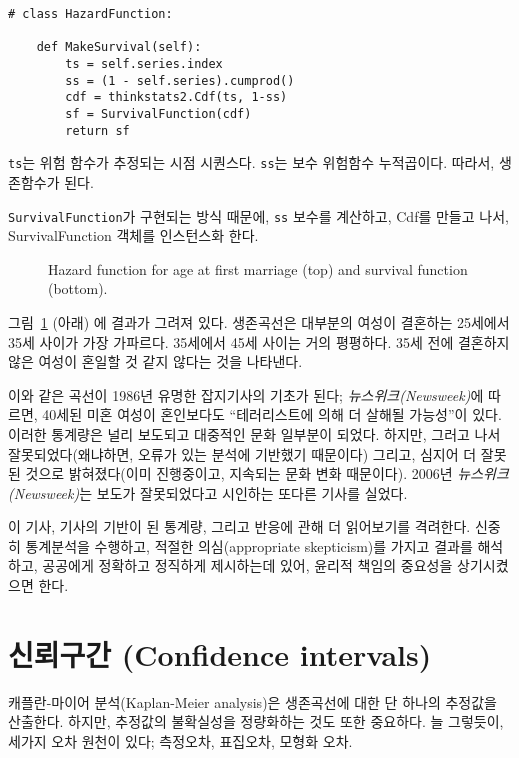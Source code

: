 \begin{verbatim}
# class HazardFunction:

    def MakeSurvival(self):
        ts = self.series.index
        ss = (1 - self.series).cumprod()
        cdf = thinkstats2.Cdf(ts, 1-ss)
        sf = SurvivalFunction(cdf)
        return sf
\end{verbatim}

{\tt ts}는 위험 함수가 추정되는 시점 시퀀스다.
{\tt ss}는 보수 위험함수 누적곱이다. 따라서, 생존함수가 된다.

{\tt SurvivalFunction}가 구현되는 방식 때문에, {\tt ss} 보수를 계산하고, Cdf를 만들고 나서, SurvivalFunction 객체를 인스턴스화 한다.


\begin{figure}
\caption{Hazard function for age at first marriage (top) and
survival function (bottom).}
\label{survival2}
\end{figure}

그림~\ref{survival2} (아래) 에 결과가 그려져 있다.
생존곡선은 대부분의 여성이 결혼하는 25세에서 35세 사이가 가장 가파르다.
35세에서 45세 사이는 거의 평평하다. 35세 전에 결혼하지 않은 여성이 혼일할 것 같지 않다는 것을 나타낸다.

이와 같은 곡선이 1986년 유명한 잡지기사의 기초가 된다; {\it 뉴스위크(Newsweek)}에 따르면, 40세된 미혼 여성이 혼인보다도 ``테러리스트에 의해 더 살해될 가능성''이 있다. 이러한 통계량은 널리 보도되고 대중적인 문화 일부분이 되었다. 하지만, 그러고 나서 잘못되었다(왜냐하면, 오류가 있는 분석에 기반했기 때문이다) 그리고, 심지어 더 잘못된 것으로 밝혀졌다(이미 진행중이고, 지속되는 문화 변화 때문이다). 2006년 {\it 뉴스위크(Newsweek)}는 보도가 잘못되었다고 시인하는 또다른 기사를 실었다.

이 기사, 기사의 기반이 된 통계량, 그리고 반응에 관해 더 읽어보기를 격려한다. 신중히 통계분석을 수행하고, 적절한 의심(appropriate skepticism)를 가지고 결과를 해석하고, 공공에게 정확하고 정직하게 제시하는데 있어, 윤리적 책임의 중요성을 상기시켰으면 한다.


\section{신뢰구간 (Confidence intervals)}

캐플란-마이어 분석(Kaplan-Meier analysis)은 생존곡선에 대한 단 하나의 추정값을 산출한다. 하지만, 추정값의 불확실성을 정량화하는 것도 또한 중요하다. 늘 그렇듯이, 세가지 오차 원천이 있다; 측정오차, 표집오차, 모형화 오차.

